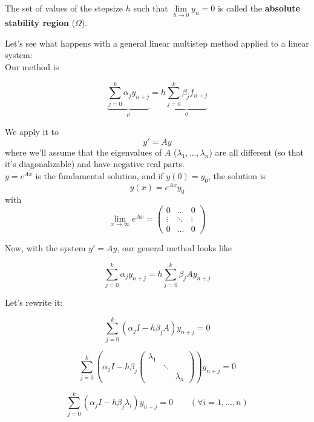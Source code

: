\begin{definition}
  The set of values of the stepsize $h$ such that $\lim\limits_{h\to0}y_n = 0$ is called the \textbf{absolute stability region} ($\Omega$).
\end{definition}

Let's see what happens with a general linear multistep method applied to a linear system:\\

Our method is

\[
  \underbrace{\sum_{j=0}^k\alpha_jy_{n+j}}_{\rho} = h\underbrace{\sum_{j=0}^k\beta_jf_{n+j}}_{\sigma}
\]

We apply it to $$y' = Ay$$ where we'll assume that the eigenvalues of $A$ ($\lambda_1, \ldots, \lambda_n$) are all different (so that it's diagonalizable) and have negative real parts. \\

$y = e^{Ax}$ is the fundamental solution, and if $y(0) = y_0$, the solution is $$y(x) = e^{Ax}y_0$$ with $$\lim_{x\to\infty}e^{Ax} = \begin{pmatrix}
                                               0      & \ldots & 0      \\
                                               \vdots & \ddots & \vdots \\
                                               0      & \ldots & 0
                                             \end{pmatrix}$$

Now, with the system $y' = Ay$, our general method looks like

\[
  \sum_{j=0}^k\alpha_jy_{n+j} = h\sum_{j=0}^k\beta_jAy_{n+j}
\]

Let's rewrite it:

$$\sum_{j=0}^k(\alpha_jI-h\beta_jA)y_{n+j} = 0$$
\begin{center}
\end{center}
$$\sum_{j=0}^k\left(\alpha_jI-h\beta_j\begin{pmatrix}\lambda_1 & & \\ & \ddots & \\ & & \lambda_n \end{pmatrix}\right)y_{n+j} = 0$$
\begin{center}
\end{center}
$$\sum_{j=0}^k(\alpha_jI-h\beta_j\lambda_i)y_{n+j} = 0 \qquad (\forall i = 1,\ldots,n)$$

\newpage

